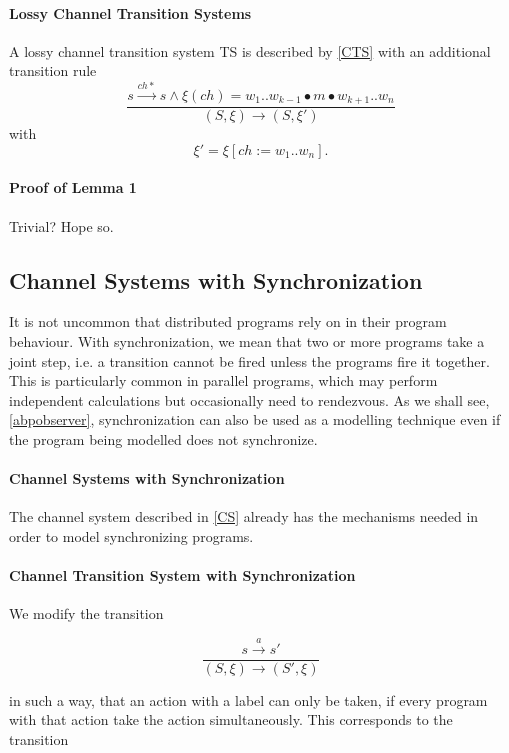 \paragraph{Lossy Channel Transition Systems}
A lossy channel transition system TS is described by \ref{CTS} with an additional transition rule
      \[
      \dfrac{s \xrightarrow{ch*} s \wedge \xi(ch) = w_1..w_{k-1}\bullet m \bullet w_{k+1}..w_n}{(S, \xi) \rightarrow (S, \xi')} \] with \[ \xi' = \xi[ch:= w_1..w_n].
      \]

\paragraph{Proof of Lemma 1}
Trivial?  Hope so.

\subsection{Channel Systems with Synchronization}
It is not uncommon that distributed programs rely on  in their program behaviour. With synchronization, we mean that two or more programs take a joint step, i.e. a transition cannot be fired unless the programs fire it together. This is particularly common in parallel programs, which may perform independent calculations but occasionally need to rendezvous. As we shall see, \ref{abpobserver}, synchronization can also be used as a modelling technique even if the program being modelled does not synchronize.

\paragraph{Channel Systems with Synchronization}
The channel system described in \ref{CS} already has the mechanisms needed in order to model synchronizing programs.

\paragraph{Channel Transition System with Synchronization}
We modify the transition

      \[
      \dfrac{s \xrightarrow{a} s'}{(S, \xi) \rightarrow (S', \xi)}
      \]

in such a way, that an action with a label  can only be taken, if every program with that action take the action simultaneously. This corresponds to the transition



